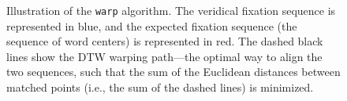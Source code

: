 \documentclass[doc,biblatex]{apa7}
\begin{document}
	\begin{figure}
	\vspace*{2pt}
	\caption{Illustration of the \texttt{warp} algorithm. The veridical fixation sequence is represented in blue, and the expected fixation sequence (the sequence of word centers) is represented in red. The dashed black lines show the DTW warping path---the optimal way to align the two sequences, such that the sum of the Euclidean distances between matched points (i.e., the sum of the dashed lines) is minimized.}
	\label{fig03}
	\end{figure}
\end{document}

